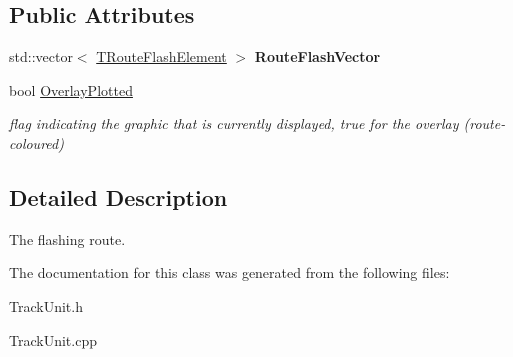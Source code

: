 \subsection*{Public Attributes}
\begin{DoxyCompactItemize}
\item 
\mbox{\label{class_t_one_route_1_1_t_route_flash_a5f8fe40f85bdc87247848d2d98685815}} 
std\+::vector$<$ \mbox{\hyperlink{class_t_one_route_1_1_t_route_flash_element}{T\+Route\+Flash\+Element}} $>$ {\bfseries Route\+Flash\+Vector}
\item 
\mbox{\label{class_t_one_route_1_1_t_route_flash_acc9544214464de94df8becea93062c62}} 
bool \mbox{\hyperlink{class_t_one_route_1_1_t_route_flash_acc9544214464de94df8becea93062c62}{Overlay\+Plotted}}
\begin{DoxyCompactList}\small\item\em flag indicating the graphic that is currently displayed, true for the overlay (route-\/coloured) \end{DoxyCompactList}\end{DoxyCompactItemize}


\subsection{Detailed Description}
The flashing route. 

The documentation for this class was generated from the following files\+:\begin{DoxyCompactItemize}
\item 
Track\+Unit.\+h\item 
Track\+Unit.\+cpp\end{DoxyCompactItemize}
